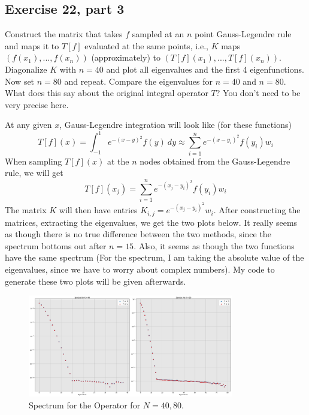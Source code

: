 \subsection{Exercise 22, part 3}
Construct the matrix that takes $f$ sampled at an $n$ point Gauss-Legendre rule and maps it to $T[f]$ evaluated at the same points, i.e., $K$ maps $(f(x_1), ..., f(x_n))$ (approximately) to $(T[f](x_1), ..., T[f](x_n))$. Diagonalize $K$ with $n = 40$ and plot all eigenvalues and the first 4 eigenfunctions. Now set $n = 80$ and repeat. Compare the eigenvalues for $n = 40$ and $n = 80$. What does this say about the original integral operator $T$? You don't need to be very precise here.
\partbreak
\begin{solution}

    At any given $x$, Gauss-Legendre integration will look like (for these functions)
    \[T[f](x) =  \int_{-1}^1 e^{-(x - y)^2}f(y) \ dy \approx \sum_{i = 1}^n e^{-(x - y_i)^2}f(y_i)w_i \]
    When sampling $T[f](x)$ at the $n$ nodes obtained from the Gauss-Legendre rule, we will get 
    \[T[f](x_j) = \sum_{i = 1}^n e^{-(x_j - y_i)^2}f(y_i) w_i\]
    The matrix $K$ will then have entries $K_{i, j} = e^{-(x_j - y_i)^2}w_i$. After constructing the matrices, extracting the eigenvalues, we get the two plots below. It really seems as though there is no true difference between the two methods, since the spectrum bottoms out after $n = 15$. Also, it seems as though the two functions have the same spectrum (For the spectrum, I am taking the absolute value of the eigenvalues, since we have to worry about complex numbers). My code to generate these two plots will be given afterwards. 
\end{solution}
\vspace{0.4in}
\begin{figure}[!ht]
    \centering
    \includegraphics[width = 0.8\textwidth]{Plots/Exercise 22c.png}
    \caption{Spectrum for the Operator for $N = 40, 80$.}
    \label{fig:Exercise 22c}
\end{figure}
\newpage


